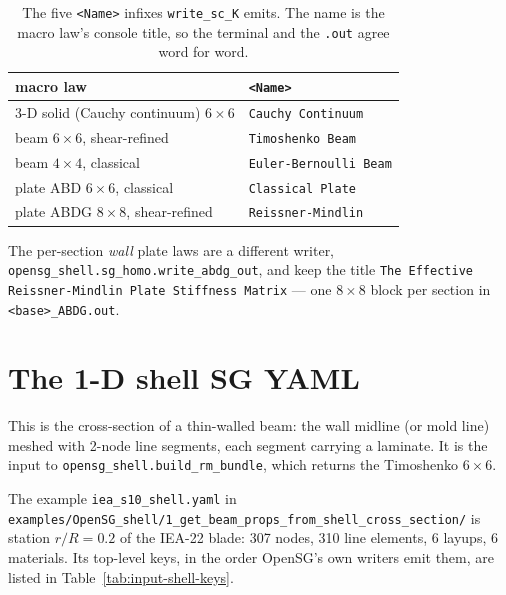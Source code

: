\begin{table}[htbp]
\centering
\small
\caption{The five \texttt{<Name>} infixes \texttt{write\_sc\_K} emits. The name
is the macro law's console title, so the terminal and the \texttt{.out} agree
word for word.}
\label{tab:input-outnames}
\begin{tabular}{@{}ll@{}}
\toprule
macro law & \texttt{<Name>} \\
\midrule
3-D solid (Cauchy continuum) $6\times6$ & \texttt{Cauchy Continuum} \\
beam $6\times6$, shear-refined & \texttt{Timoshenko Beam} \\
beam $4\times4$, classical & \texttt{Euler-Bernoulli Beam} \\
plate ABD $6\times6$, classical & \texttt{Classical Plate} \\
plate ABDG $8\times8$, shear-refined & \texttt{Reissner-Mindlin} \\
\bottomrule
\end{tabular}
\end{table}

The per-section \emph{wall} plate laws are a different writer,
\texttt{opensg\_shell.sg\_homo.write\_abdg\_out}, and keep the title
\texttt{The Effective Reissner-Mindlin Plate Stiffness Matrix} --- one
$8\times8$ block per section in \texttt{<base>\_ABDG.out}.

\section{The 1-D shell SG YAML}
\label{sec:input-shell1d}

This is the cross-section of a thin-walled beam: the wall midline (or mold line)
meshed with 2-node line segments, each segment carrying a laminate. It is the
input to \texttt{opensg\_shell.build\_rm\_bundle}, which returns the Timoshenko
$6\times6$.

The example \texttt{iea\_s10\_shell.yaml} in
\texttt{examples/OpenSG\_shell/1\_get\_beam\_props\_from\_shell\_cross\_section/}
is station $r/R = 0.2$ of the IEA-22 blade: 307 nodes, 310 line elements, 6
layups, 6 materials. Its top-level keys, in the order OpenSG's own writers emit
them, are listed in Table~\ref{tab:input-shell-keys}.

